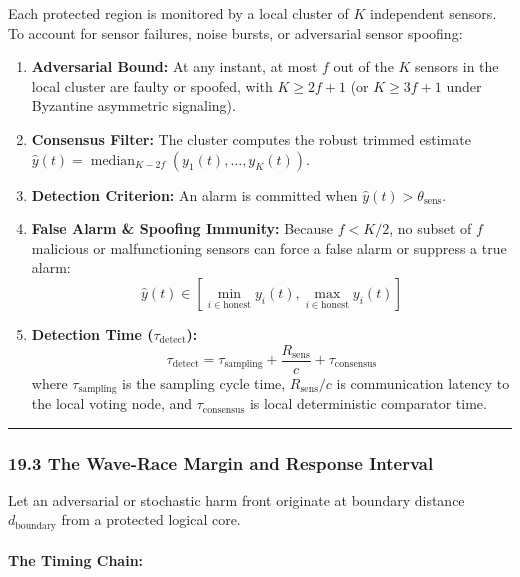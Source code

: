 \documentclass[
]{article}
\providecommand{\tightlist}{%
  \setlength{\itemsep}{0pt}\setlength{\parskip}{0pt}}
\begin{document}
Each protected region is monitored by a local cluster of \(K\)
independent sensors. To account for sensor failures, noise bursts, or
adversarial sensor spoofing:

\begin{enumerate}
\def\labelenumi{\arabic{enumi}.}
\tightlist
\item
  \textbf{Adversarial Bound:} At any instant, at most \(f\) out of the
  \(K\) sensors in the local cluster are faulty or spoofed, with
  \(K \ge 2f + 1\) (or \(K \ge 3f + 1\) under Byzantine asymmetric
  signaling).
\item
  \textbf{Consensus Filter:} The cluster computes the robust trimmed
  estimate
  \(\hat{y}(t) = \operatorname{median}_{K-2f}(y_1(t), \dots, y_K(t))\).
\item
  \textbf{Detection Criterion:} An alarm is committed when
  \(\hat{y}(t) > \theta_{\mathrm{sens}}\).
\item
  \textbf{False Alarm \& Spoofing Immunity:} Because \(f < K/2\), no
  subset of \(f\) malicious or malfunctioning sensors can force a false
  alarm or suppress a true alarm:
  \[\hat{y}(t) \in [\min_{i \in \mathrm{honest}} y_i(t), \max_{i \in \mathrm{honest}} y_i(t)]\]
\item
  \textbf{Detection Time (\(\tau_{\mathrm{detect}}\)):}
  \[\tau_{\mathrm{detect}} = \tau_{\mathrm{sampling}} + \frac{R_{\mathrm{sens}}}{c} + \tau_{\mathrm{consensus}}\]
  where \(\tau_{\mathrm{sampling}}\) is the sampling cycle time,
  \(R_{\mathrm{sens}}/c\) is communication latency to the local voting
  node, and \(\tau_{\mathrm{consensus}}\) is local deterministic
  comparator time.
\end{enumerate}

\begin{center}\rule{0.5\linewidth}{0.5pt}\end{center}

\subsubsection{19.3 The Wave-Race Margin and Response
Interval}\label{the-wave-race-margin-and-response-interval}

Let an adversarial or stochastic harm front originate at boundary
distance \(d_{\mathrm{boundary}}\) from a protected logical core.

\paragraph{The Timing Chain:}\label{the-timing-chain}
\end{document}
